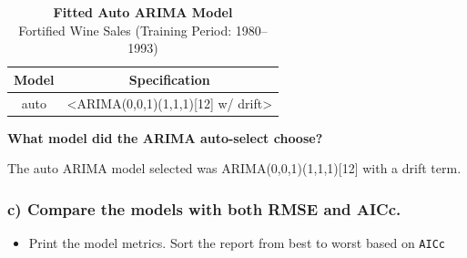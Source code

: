 \documentclass[
  letterpaper,
  DIV=11,
  numbers=noendperiod]{scrartcl}
\providecommand{\tightlist}{%
  \setlength{\itemsep}{0pt}\setlength{\parskip}{0pt}}
\begin{document}
\begin{table}
\caption*{
{\fontsize{20}{25}\selectfont  \textbf{Fitted Auto ARIMA Model}\fontsize{12}{15}\selectfont } \\ 
{\fontsize{14}{17}\selectfont  Fortified Wine Sales (Training Period: 1980–1993)\fontsize{12}{15}\selectfont }
} 
\fontsize{12.0pt}{14.0pt}\selectfont
\begin{tabular*}{0.6\linewidth}{@{\extracolsep{\fill}}cc}
\toprule
Model & Specification \\ 
\midrule\addlinespace[2.5pt]
auto & <ARIMA(0,0,1)(1,1,1)[12] w/ drift> \\ 
\bottomrule
\end{tabular*}
\end{table}

\textbf{What model did the ARIMA auto-select choose?}

The auto ARIMA model selected was ARIMA(0,0,1)(1,1,1){[}12{]} with a
drift term.

\newpage

\subsubsection{c) Compare the models with both RMSE and
AICc.}\label{c-compare-the-models-with-both-rmse-and-aicc.}

\begin{itemize}
\tightlist
\item
  Print the model metrics. Sort the report from best to worst based on
  \texttt{AICc}
\end{itemize}
\end{document}
